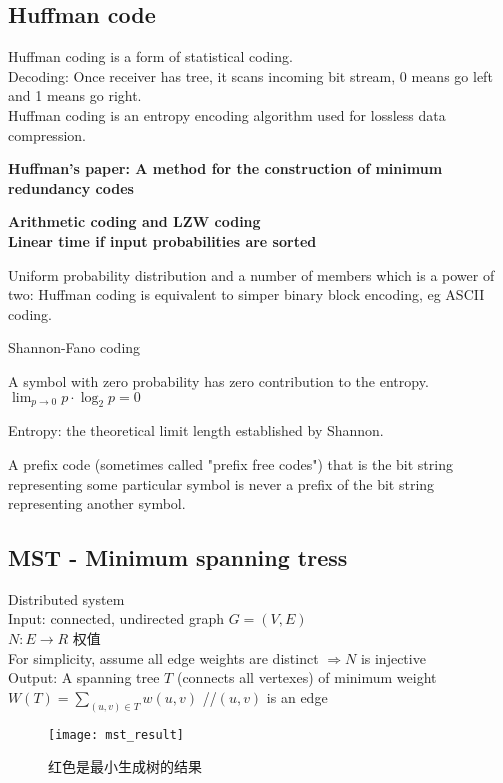 \documentclass{article}
\begin{document}
\subsection{Huffman code}
Huffman coding is a form of statistical coding.\\
Decoding: Once receiver has tree, it scans incoming bit stream, 0 means go left and 1 means go right.\\
Huffman coding is an entropy encoding algorithm used for lossless data compression.

\textbf{Huffman's paper: A method for the construction of minimum redundancy codes}

\textbf{Arithmetic coding and LZW coding}\\
\textbf{Linear time if input probabilities are sorted}

Uniform probability distribution and a number of members which is a power of two: Huffman coding is equivalent to simper binary block encoding, eg ASCII coding.

Shannon-Fano coding

A symbol with zero probability has zero contribution to the entropy.\\
$\lim_{p \to 0} p \cdot \log_{2} p = 0$

Entropy: the theoretical limit length established by Shannon.

A prefix code (sometimes called "prefix free codes") that is the bit string representing some particular symbol is never a prefix of the bit string representing another symbol.

\subsection{MST - Minimum spanning tress}
Distributed system\\
Input: connected, undirected graph $G=(V, E)$\\
$N: E \rightarrow R$ 权值\\
For simplicity, assume all edge weights are distinct $\Rightarrow N$ is injective\\
Output: A spanning tree $T$ (connects all vertexes) of minimum weight\\
	$W(T) = \sum_{(u, v) \in T} w(u, v)$ //$(u,v)$ is an edge

\begin{figure}[htbp]
  \centering
  \texttt{[image: mst\_result]}\\
  \caption{红色是最小生成树的结果}\label{fig.mst.result}
\end{figure}
\end{document}
